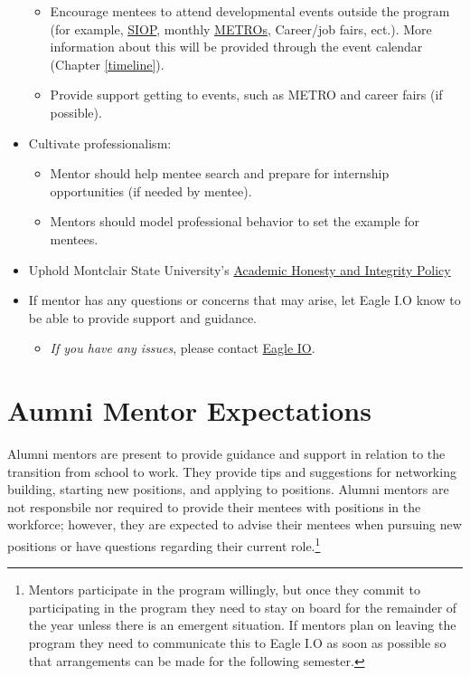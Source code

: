\documentclass[
  openany]{book}
\providecommand{\tightlist}{%
  \setlength{\itemsep}{0pt}\setlength{\parskip}{0pt}}
\begin{document}
\begin{itemize}
  \begin{itemize}
  \tightlist
  \item
    Encourage mentees to attend developmental events outside the program (for example, \href{http://www.siop.org}{SIOP}, monthly \href{http://www.metroapppsych.com/}{METROs}, Career/job fairs, ect.). More information about this will be provided through the event calendar (Chapter \ref{timeline}).
  \item
    Provide support getting to events, such as METRO and career fairs (if possible).
  \end{itemize}
\item
  Cultivate professionalism:

  \begin{itemize}
  \tightlist
  \item
    Mentor should help mentee search and prepare for internship opportunities (if needed by mentee).
  \item
    Mentors should model professional behavior to set the example for mentees.
  \end{itemize}
\item
  Uphold Montclair State University's \href{https://www.montclair.edu/policies/all-policies/academic-honesty-and-integrity/}{Academic Honesty and Integrity Policy}
\item
  If mentor has any questions or concerns that may arise, let Eagle I.O know to be able to provide support and guidance.

  \begin{itemize}
  \tightlist
  \item
    \emph{If you have any issues}, please contact \href{mailto:eagleio@montclair.edu}{Eagle IO}.
  \end{itemize}
\end{itemize}

\hypertarget{aumni-mentor-expectations}{%
\section{Aumni Mentor Expectations}\label{aumni-mentor-expectations}}

Alumni mentors are present to provide guidance and support in relation to the transition from school to work. They provide tips and suggestions for networking building, starting new positions, and applying to positions. Alumni mentors are not responsbile nor required to provide their mentees with positions in the workforce; however, they are expected to advise their mentees when pursuing new positions or have questions regarding their current role.\footnote{Mentors participate in the program willingly, but once they commit to participating in the program they need to stay on board for the remainder of the year unless there is an emergent situation. If mentors plan on leaving the program they need to communicate this to Eagle I.O as soon as possible so that arrangements can be made for the following semester.}
\end{document}

